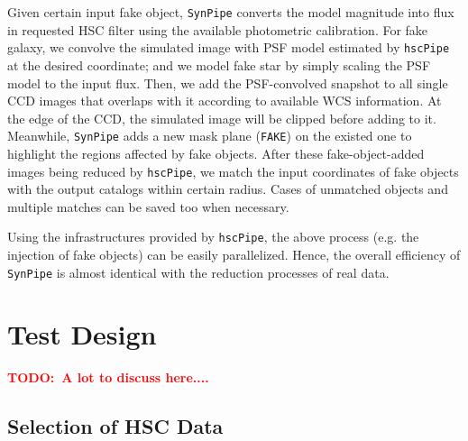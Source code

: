 \documentclass[preprint]{aastex}
\newcommand{\todo}[1]{\textcolor{red}{\textbf{TODO:~#1}}}
\begin{document}
    Given certain input fake object, \texttt{SynPipe} converts the model magnitude into flux
    in requested HSC filter using the available photometric calibration.  For fake galaxy, we
    convolve the simulated image with PSF model estimated by \texttt{hscPipe} at the desired
    coordinate; and we model fake star by simply scaling the PSF model to the input flux.
    Then, we add the PSF-convolved snapshot to all single CCD images that overlaps with it
    according to available WCS information.  At the edge of the CCD, the simulated image will
    be clipped before adding to it.  Meanwhile, \texttt{SynPipe} adds a new mask plane
    (\texttt{FAKE}) on the existed one to highlight the regions affected by fake objects.
    After these fake-object-added images being reduced by \texttt{hscPipe}, we match the input
    coordinates of fake objects with the output catalogs within certain radius.  Cases of
    unmatched objects and multiple matches can be saved too when necessary.  

    Using the infrastructures provided by \texttt{hscPipe}, the above process (e.g. the 
    injection of fake objects) can be easily parallelized.  Hence, the overall efficiency of
    \texttt{SynPipe} is almost identical with the reduction processes of real data.  
    

\section{Test Design}

\todo{A lot to discuss here....}

\subsection{Selection of HSC Data}
    
\end{document}
